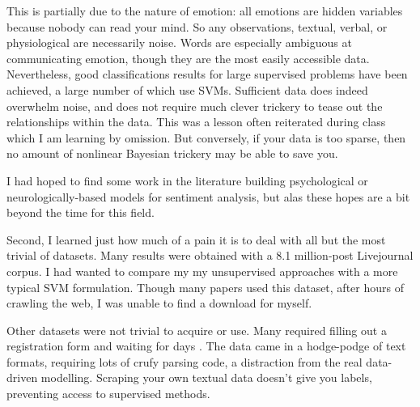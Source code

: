 \documentclass{article}
\begin{document}
This is partially due to the nature of emotion: all emotions
are hidden variables because nobody can read your mind. So any
observations, textual, verbal, or physiological are necessarily
noise. Words are especially ambiguous at communicating emotion,
though they are the most easily accessible data. Nevertheless, good
classifications results for large supervised problems have been
achieved, a large number of which use SVMs. Sufficient data does
indeed overwhelm noise, and does not require much clever trickery
to tease out the relationships within the data. This was a lesson
often reiterated during class which I am learning by omission. But
conversely, if your data is too sparse, then no amount of nonlinear
Bayesian trickery may be able to save you.

I had hoped to find some work in the literature building psychological
or neurologically-based models for sentiment analysis, but alas
these hopes are a bit beyond the time for this field.

Second, I learned just how much of a pain it is to deal with all
but the most trivial of datasets. Many results were obtained with
a 8.1 million-post Livejournal corpus. I had wanted to compare my
my unsupervised approaches with a more typical SVM formulation.
Though many papers used this dataset, after hours of crawling the
web, I was unable to find a download for myself.

Other datasets were not trivial to acquire or use. Many required
filling out a registration form and waiting for days \citep{baccianella10}.
The data came in a hodge-podge of text formats, requiring
lots of crufy parsing code, a distraction from the real
data-driven modelling. Scraping your own textual data doesn't
give you labels, preventing access to supervised methods.

\begin{small}

 
\end{small}
\end{document}
